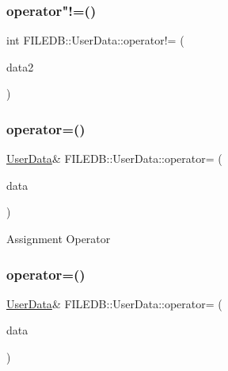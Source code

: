 \mbox{\label{classFILEDB_1_1UserData_acfdc12e0f4dbc6faebe8bf89856fee8d}} 
\subsubsection{\texorpdfstring{operator"!=()}{operator!=()}\hspace{0.1cm}{\footnotesize\ttfamily [3/3]}}
{\footnotesize\ttfamily int F\+I\+L\+E\+D\+B\+::\+User\+Data\+::operator!= (\begin{DoxyParamCaption}\item[{const \mbox{\hyperlink{classFILEDB_1_1UserData}{User\+Data}} \&}]{data2 }\end{DoxyParamCaption})}

\mbox{\label{classFILEDB_1_1UserData_a27ceb819128358fb4384362b9f8440d1}} 
\subsubsection{\texorpdfstring{operator=()}{operator=()}\hspace{0.1cm}{\footnotesize\ttfamily [1/6]}}
{\footnotesize\ttfamily \mbox{\hyperlink{classFILEDB_1_1UserData}{User\+Data}}\& F\+I\+L\+E\+D\+B\+::\+User\+Data\+::operator= (\begin{DoxyParamCaption}\item[{const \mbox{\hyperlink{classFILEDB_1_1UserData}{User\+Data}} \&}]{data }\end{DoxyParamCaption})}

Assignment Operator \mbox{\label{classFILEDB_1_1UserData_a27ceb819128358fb4384362b9f8440d1}} 
\subsubsection{\texorpdfstring{operator=()}{operator=()}\hspace{0.1cm}{\footnotesize\ttfamily [2/6]}}
{\footnotesize\ttfamily \mbox{\hyperlink{classFILEDB_1_1UserData}{User\+Data}}\& F\+I\+L\+E\+D\+B\+::\+User\+Data\+::operator= (\begin{DoxyParamCaption}\item[{const \mbox{\hyperlink{classFILEDB_1_1UserData}{User\+Data}} \&}]{data }\end{DoxyParamCaption})}

